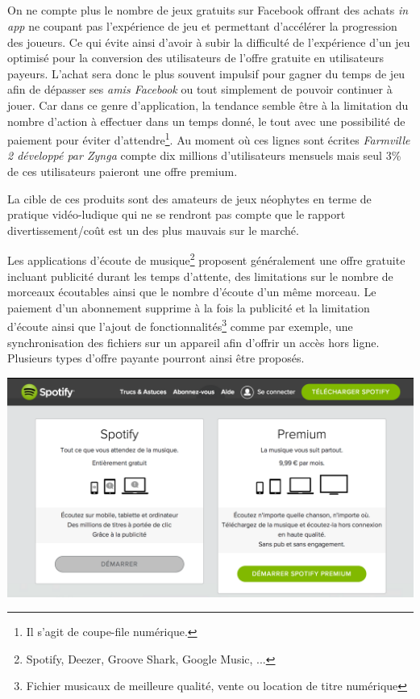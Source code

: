 \documentclass[11pt, a4paper ]{article}
\begin{document}
\begin{spacing}{1.5}
\subparagraph{} %

On ne compte plus le nombre de jeux gratuits sur Facebook offrant des achats \emph{in app} ne coupant pas l'expérience de jeu et permettant d’accélérer la progression des joueurs. Ce qui évite ainsi d'avoir à subir la difficulté de l'expérience d'un jeu optimisé pour la conversion des utilisateurs de l'offre gratuite en utilisateurs payeurs. L'achat sera donc le plus souvent impulsif pour gagner du temps de jeu afin de dépasser ses \emph{amis Facebook} ou tout simplement de pouvoir continuer à jouer. Car dans ce genre d'application, la tendance semble être à la limitation du nombre d'action à effectuer dans un temps donné, le tout avec une possibilité de paiement pour éviter d'attendre\footnote{Il s'agit de coupe-file numérique.}. Au moment où ces lignes sont écrites \emph{Farmville 2 développé par Zynga} compte dix millions d'utilisateurs mensuels mais seul 3\% de ces utilisateurs paieront une offre premium.


La cible de ces produits sont des amateurs de jeux néophytes en terme de pratique vidéo-ludique qui ne se rendront pas compte que le rapport divertissement/coût est un des plus mauvais sur le marché.

\subsubparagraph{}
Les applications d'écoute de musique\footnote{Spotify, Deezer, Groove Shark, Google Music, ...} proposent généralement une offre gratuite incluant publicité durant les temps d'attente, des limitations sur le nombre de morceaux écoutables ainsi que le nombre d'écoute d'un même morceau.
Le paiement d'un abonnement supprime à la fois la publicité et la limitation d'écoute ainsi que l'ajout de fonctionnalités\footnote{Fichier musicaux de meilleure qualité, vente ou location de titre numérique} comme par exemple, une synchronisation des fichiers sur un appareil afin d'offrir un accès hors ligne. Plusieurs types d'offre payante pourront ainsi être proposés.


\begin{center}
	\includegraphics[width=\textwidth]{images/media/premiumSpotify.png}
\end{center}


\end{spacing}
\end{document}
